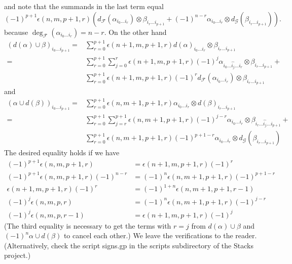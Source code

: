 and note that the summands in the last term equal
$$
(-1)^{p + 1} \epsilon(n, m, p + 1, r)
\left(
d_{\mathcal F}(\alpha_{i_0 \ldots i_r}) \otimes
\beta_{i_r \ldots i_{p + 1}} +
(-1)^{n - r}
\alpha_{i_0 \ldots i_r} \otimes d_{\mathcal G}(\beta_{i_r \ldots i_{p + 1}})
\right).
$$
because $\deg_\mathcal{F}(\alpha_{i_0 \ldots i_r}) = n - r$.
On the other hand
\begin{align*}
(d(\alpha) \cup \beta)_{i_0\ldots i_{p + 1}}
= &
\sum\nolimits_{r = 0}^{p + 1}
\epsilon(n + 1, m, p + 1, r)
d(\alpha)_{i_0\ldots i_r} \otimes \beta_{i_r\ldots i_{p + 1}}
\\
= &
\sum\nolimits_{r = 0}^{p + 1}
\sum\nolimits_{j = 0}^{r}
\epsilon(n + 1, m, p + 1, r) (-1)^j
\alpha_{i_0\ldots\hat{i_j}\ldots i_r} \otimes \beta_{i_r\ldots i_{p + 1}}
+ \\
&
\sum\nolimits_{r = 0}^{p + 1}
\epsilon(n + 1, m, p + 1, r) (-1)^r
d_{\mathcal F}(\alpha_{i_0 \ldots i_r}) \otimes \beta_{i_r\ldots i_{p + 1}}
\end{align*}
and
\begin{align*}
(\alpha \cup d(\beta))_{i_0\ldots i_{p + 1}}
= &
\sum\nolimits_{r = 0}^{p + 1}
\epsilon(n, m + 1, p + 1, r)
\alpha_{i_0 \ldots i_r} \otimes d(\beta)_{i_r \ldots i_{p + 1}}
\\
= &
\sum\nolimits_{r = 0}^{p + 1}
\sum\nolimits_{j = r}^{p + 1}
\epsilon(n, m + 1, p + 1, r) (-1)^{j - r}
\alpha_{i_0 \ldots i_r} \otimes \beta_{i_r \ldots \hat{i_j}\ldots i_{p + 1}}
+ \\
&
\sum\nolimits_{r = 0}^{p + 1}
\epsilon(n, m + 1, p + 1, r) (-1)^{p + 1 - r}
\alpha_{i_0 \ldots i_r} \otimes d_{\mathcal G}(\beta_{i_r \ldots i_{p + 1}})
\end{align*}
The desired equality holds if we have
\begin{align*}
(-1)^{p + 1} \epsilon(n, m, p + 1, r)
& =
\epsilon(n + 1, m, p + 1, r) (-1)^r \\
(-1)^{p + 1} \epsilon(n, m, p + 1, r) (-1)^{n - r}
& =
(-1)^n \epsilon(n, m + 1, p + 1, r) (-1)^{p + 1 - r} \\
\epsilon(n + 1, m, p + 1, r) (-1)^r
& =
(-1)^{1 + n} \epsilon(n, m + 1, p + 1, r - 1) \\
(-1)^j \epsilon(n, m, p, r)
& =
(-1)^n \epsilon(n, m + 1, p + 1, r) (-1)^{j - r} \\
(-1)^j \epsilon(n, m, p, r - 1)
& =
\epsilon(n + 1, m, p + 1, r) (-1)^j
\end{align*}
(The third equality is necessary to get the terms with $r = j$
from $d(\alpha) \cup \beta$ and $(-1)^n \alpha \cup d(\beta)$
to cancel each other.) We leave the verifications to the reader.
(Alternatively, check the script signs.gp in the scripts subdirectory
of the Stacks project.)


